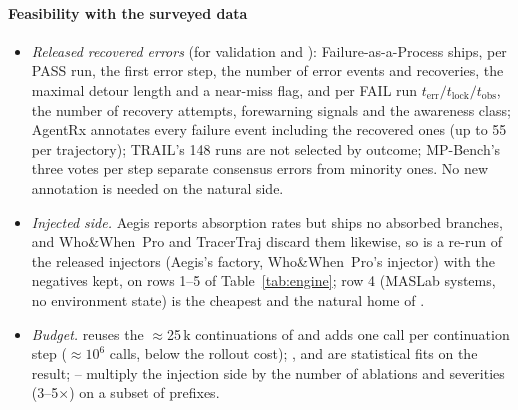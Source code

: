 \paragraph{Feasibility with the surveyed data}
\begin{itemize}[leftmargin=1.1em]
\item \emph{Released recovered errors} (for  validation and ): Failure-as-a-Process ships, per PASS run, the first error step, the number of error events and recoveries, the maximal detour length and a near-miss flag, and per FAIL run $t_{\mathrm{err}}/t_{\mathrm{lock}}/t_{\mathrm{obs}}$, the number of recovery attempts, forewarning signals and the awareness class; AgentRx annotates every failure event including the recovered ones (up to 55 per trajectory); TRAIL's 148 runs are not selected by outcome; MP-Bench's three votes per step separate consensus errors from minority ones. No new annotation is needed on the natural side.
\item \emph{Injected side.} Aegis reports absorption rates but ships no absorbed branches, and Who\&When~Pro and TracerTraj discard them likewise, so  is a re-run of the released injectors (Aegis's factory, Who\&When~Pro's injector) with the negatives kept, on rows 1--5 of Table~\ref{tab:engine}; row 4 (MASLab systems, no environment state) is the cheapest and the natural home of .
\item \emph{Budget.}  reuses the $\approx$25\,k continuations of  and adds one call per continuation step ($\approx10^6$ calls, below the rollout cost); ,  and  are statistical fits on the result; -- multiply the injection side by the number of ablations and severities (3--5$\times$) on a subset of prefixes.
\end{itemize}

